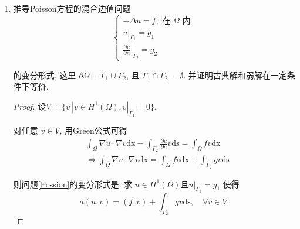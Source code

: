 \documentclass[12pt,a4paper]{article}
\begin{document}
\begin{enumerate}
\begin{proof}[证明]
			其中
			$$
			g(x)=|x|= \begin{cases}1, & 0<x<1 \\ -1, & -1<x<0\end{cases}
			$$
			
			显然$g$是局部Lesbegue可积函数,故$g$是$f$的一阶广义导数.
		\end{proof}
		
		\item 推导Poisson方程的混合边值问题
		\begin{equation} 
			\left\{\begin{array}{l}
				-\Delta u=f, \text { 在 } \Omega \text { 内 } \\
				\left.u\right|_{\Gamma_1}=g_1 \\
				\left.\frac{\partial u}{\partial n}\right|_{\Gamma_2}=g_2
			\end{array}\right. \label{Possion}
		\end{equation}
		
		
		
		的变分形式, 这里 $\partial \Omega=\Gamma_1 \cup \Gamma_2$, 且 $\Gamma_1 \cap \Gamma_2=\emptyset$. 并证明古典解和弱解在一定条件下等价.
		
		\begin{proof}
			设$V = \{v\ | v \in H^1(\Omega), v|_{\Gamma_1} = 0\}$.
			
			对任意 $v \in V$, 用Green公式可得
			$$
			\begin{aligned}
				& \int_{\Omega} \nabla u \cdot \nabla v \mathrm{dx}-\int_{\Gamma_2} \frac{\partial u}{\partial n} v \mathrm{ds}=\int_{\Omega} f v \mathrm{dx} \\
				& \Rightarrow \int_{\Omega} \nabla u \cdot \nabla v \mathrm{dx}=\int_{\Omega} f v \mathrm{dx}+\int_{\Gamma_2} g v \mathrm{ds}
			\end{aligned}
			$$
			
			则问题\eqref{Possion}的变分形式是: 求 $u \in H^1(\Omega)$且$u|_{\Gamma_1} = g_1$ 使得
			$$
			a(u, v)=(f, v)+\int_{\Gamma_2} g v \mathrm{ds}, \quad \forall v \in V.
			$$
		\end{proof}
	\end{enumerate}
	
		
	
\end{document}

